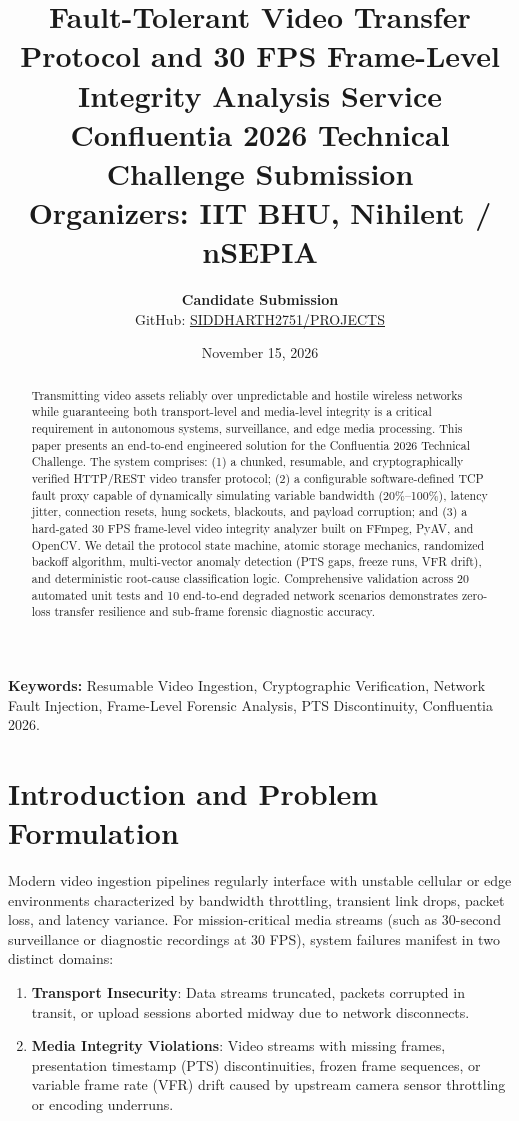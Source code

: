 \documentclass[11pt,a4paper]{article}
\title{\textbf{\Large Fault-Tolerant Video Transfer Protocol and 30 FPS Frame-Level Integrity Analysis Service}\\[0.4em]
\large Confluentia 2026 Technical Challenge Submission\\
\normalsize Organizers: IIT BHU, Nihilent / nSEPIA}
\author{\textbf{Candidate Submission} \\
GitHub: \href{https://github.com/SIDDHARTH2751/PROJECTS}{SIDDHARTH2751/PROJECTS}}
\date{November 15, 2026}
\begin{document}
\maketitle

\begin{abstract}
Transmitting video assets reliably over unpredictable and hostile wireless networks while guaranteeing both transport-level and media-level integrity is a critical requirement in autonomous systems, surveillance, and edge media processing. This paper presents an end-to-end engineered solution for the Confluentia 2026 Technical Challenge. The system comprises: (1) a chunked, resumable, and cryptographically verified HTTP/REST video transfer protocol; (2) a configurable software-defined TCP fault proxy capable of dynamically simulating variable bandwidth (20\%--100\%), latency jitter, connection resets, hung sockets, blackouts, and payload corruption; and (3) a hard-gated 30 FPS frame-level video integrity analyzer built on FFmpeg, PyAV, and OpenCV. We detail the protocol state machine, atomic storage mechanics, randomized backoff algorithm, multi-vector anomaly detection (PTS gaps, freeze runs, VFR drift), and deterministic root-cause classification logic. Comprehensive validation across 20 automated unit tests and 10 end-to-end degraded network scenarios demonstrates zero-loss transfer resilience and sub-frame forensic diagnostic accuracy.
\end{abstract}

\vspace{0.5em}
\noindent\textbf{Keywords:} Resumable Video Ingestion, Cryptographic Verification, Network Fault Injection, Frame-Level Forensic Analysis, PTS Discontinuity, Confluentia 2026.

\section{Introduction and Problem Formulation}

Modern video ingestion pipelines regularly interface with unstable cellular or edge environments characterized by bandwidth throttling, transient link drops, packet loss, and latency variance. For mission-critical media streams (such as 30-second surveillance or diagnostic recordings at 30 FPS), system failures manifest in two distinct domains:
\begin{enumerate}[leftmargin=*,itemsep=1pt]
    \item \textbf{Transport Insecurity}: Data streams truncated, packets corrupted in transit, or upload sessions aborted midway due to network disconnects.
    \item \textbf{Media Integrity Violations}: Video streams with missing frames, presentation timestamp (PTS) discontinuities, frozen frame sequences, or variable frame rate (VFR) drift caused by upstream camera sensor throttling or encoding underruns.
\end{enumerate}
\end{document}
